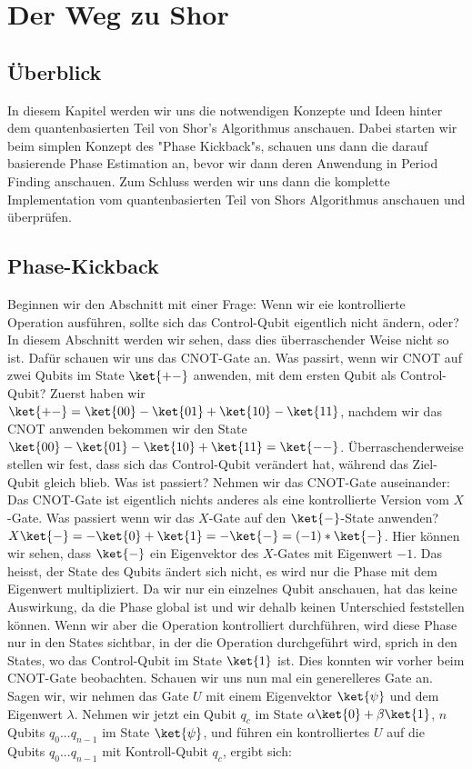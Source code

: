 \chapter{Der Weg zu Shor}
\section{Überblick}
In diesem Kapitel werden wir uns die notwendigen Konzepte und Ideen hinter dem quantenbasierten Teil von Shor's Algorithmus anschauen. Dabei starten wir beim simplen Konzept des "Phase Kickback"s, schauen uns dann die darauf basierende Phase Estimation an, bevor wir dann deren Anwendung in Period Finding anschauen. Zum Schluss werden wir uns dann die komplette Implementation vom quantenbasierten Teil von Shors Algorithmus anschauen und überprüfen.
\section{Phase-Kickback}
Beginnen wir den Abschnitt mit einer Frage: Wenn wir eie kontrollierte Operation ausführen, sollte sich das Control-Qubit eigentlich nicht ändern, oder? In diesem Abschnitt werden wir sehen, dass dies überraschender Weise nicht so ist. Dafür schauen wir uns das CNOT-Gate an. Was passirt, wenn wir CNOT auf zwei Qubits im State $\ket{+-}$ anwenden, mit dem ersten Qubit als Control-Qubit? Zuerst haben wir $\ket{+-} = \ket{00} - \ket{01} + \ket{10} - \ket{11}$, nachdem wir das CNOT anwenden bekommen wir den State $\ket{00} - \ket{01} - \ket{10} + \ket{11} = \ket{--}$. Überraschenderweise stellen wir fest, dass sich das Control-Qubit verändert hat, während das Ziel-Qubit gleich blieb. Was ist passiert? Nehmen wir das CNOT-Gate auseinander: Das CNOT-Gate ist eigentlich nichts anderes als eine kontrollierte Version vom $X$-Gate. Was passiert wenn wir das $X$-Gate auf den $\ket{-}$-State anwenden? $X\ket{-} = -\ket{0} + \ket{1} = -\ket{-} = (-1)*\ket{-}$. Hier können wir sehen, dass $\ket{-}$ ein Eigenvektor des $X$-Gates mit Eigenwert $-1$. Das heisst, der State des Qubits ändert sich nicht, es wird nur die Phase mit dem Eigenwert multipliziert. Da wir nur ein einzelnes Qubit anschauen, hat das keine Auswirkung, da die Phase global ist und wir dehalb keinen Unterschied feststellen können. Wenn wir aber die Operation kontrolliert durchführen, wird diese Phase nur in den States sichtbar, in der die Operation durchgeführt wird, sprich in den States, wo das Control-Qubit im State $\ket{1}$ ist. Dies konnten wir vorher beim CNOT-Gate beobachten. Schauen wir uns nun mal ein generelleres Gate an. Sagen wir, wir nehmen das Gate $U$ mit einem Eigenvektor $\ket{\psi}$ und dem Eigenwert $\lambda$. Nehmen wir jetzt ein Qubit $q_c$ im State $\alpha\ket{0} + \beta\ket{1}$, $n$ Qubits $q_0 ... q_{n-1}$ im State $\ket{\psi}$, und führen ein kontrolliertes $U$ auf die Qubits $q_0 ... q_{n-1}$ mit Kontroll-Qubit $q_c$, ergibt sich:

